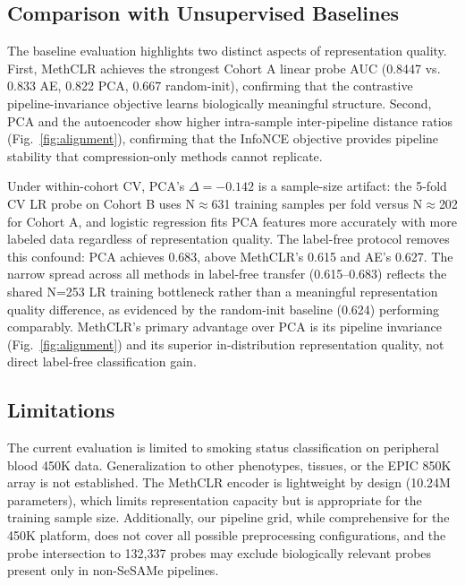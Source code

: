 \documentclass[conference]{IEEEtran}
\begin{document}
\subsection{Comparison with Unsupervised Baselines}

The baseline evaluation highlights two distinct aspects of representation quality. First, MethCLR achieves the strongest Cohort A linear probe AUC (0.8447 vs. 0.833 AE, 0.822 PCA, 0.667 random-init), confirming that the contrastive pipeline-invariance objective learns biologically meaningful structure. Second, PCA and the autoencoder show higher intra-sample inter-pipeline distance ratios (Fig.~\ref{fig:alignment}), confirming that the InfoNCE objective provides pipeline stability that compression-only methods cannot replicate.

Under within-cohort CV, PCA's $\Delta=-0.142$ is a sample-size artifact: the 5-fold CV LR probe on Cohort B uses N$\approx$631 training samples per fold versus N$\approx$202 for Cohort A, and logistic regression fits PCA features more accurately with more labeled data regardless of representation quality. The label-free protocol removes this confound: PCA achieves 0.683, above MethCLR's 0.615 and AE's 0.627. The narrow spread across all methods in label-free transfer (0.615--0.683) reflects the shared N=253 LR training bottleneck rather than a meaningful representation quality difference, as evidenced by the random-init baseline (0.624) performing comparably. MethCLR's primary advantage over PCA is its pipeline invariance (Fig.~\ref{fig:alignment}) and its superior in-distribution representation quality, not direct label-free classification gain.

\subsection{Limitations}

The current evaluation is limited to smoking status classification on peripheral blood 450K data. Generalization to other phenotypes, tissues, or the EPIC 850K array is not established. The MethCLR encoder is lightweight by design (10.24M parameters), which limits representation capacity but is appropriate for the training sample size. Additionally, our pipeline grid, while comprehensive for the 450K platform, does not cover all possible preprocessing configurations, and the probe intersection to 132,337 probes may exclude biologically relevant probes present only in non-SeSAMe pipelines.

\end{document}
